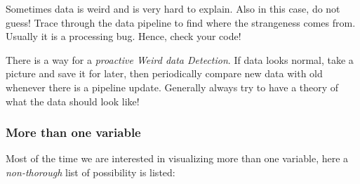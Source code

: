 Sometimes data is weird and is very hard to explain. Also in this case, do not guess! Trace through the data pipeline to find where the strangeness comes from. Usually it is a processing bug. Hence, check your code!

There is a way for a \emph{proactive Weird data Detection}. If data looks normal, take a picture and save it for later, then periodically compare new data with old whenever there is a pipeline update. Generally always try to have a theory of what the data should look like!

\subsubsection{More than one variable}
 
Most of the time we are interested in visualizing more than one variable, here a \emph{non-thorough} list of possibility is listed:

